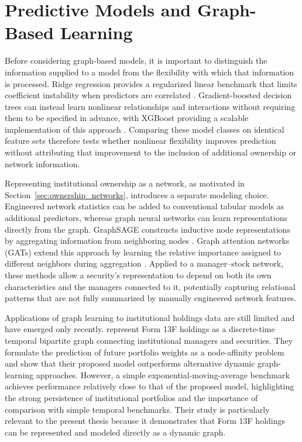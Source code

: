 \section{Predictive Models and Graph-Based Learning}
\label{sec:graph_learning_finance}

Before considering graph-based models, it is important to distinguish the information supplied to a model from the flexibility with which that information is processed. Ridge regression provides a regularized linear benchmark that limits coefficient instability when predictors are correlated \parencite{hoerl1970ridge}. Gradient-boosted decision trees can instead learn nonlinear relationships and interactions without requiring them to be specified in advance, with XGBoost providing a scalable implementation of this approach \parencite{chen2016xgboost}. Comparing these model classes on identical feature sets therefore tests whether nonlinear flexibility improves prediction without attributing that improvement to the inclusion of additional ownership or network information.

Representing institutional ownership as a network, as motivated in Section~\ref{sec:ownership_networks}, introduces a separate modeling choice. Engineered network statistics can be added to conventional tabular models as additional predictors, whereas graph neural networks can learn representations directly from the graph. GraphSAGE constructs inductive node representations by aggregating information from neighboring nodes \parencite{hamilton2017inductive}. Graph attention networks (GATs) extend this approach by learning the relative importance assigned to different neighbors during aggregation \parencite{velickovic2018graph}. Applied to a manager--stock network, these methods allow a security's representation to depend on both its own characteristics and the managers connected to it, potentially capturing relational patterns that are not fully summarized by manually engineered network features.

Applications of graph learning to institutional holdings data are still limited and have emerged only recently. \textcite{izadifar2026institutional} represent Form 13F holdings as a discrete-time temporal bipartite graph connecting institutional managers and securities. They formulate the prediction of future portfolio weights as a node-affinity problem and show that their proposed model outperforms alternative dynamic graph-learning approaches. However, a simple exponential-moving-average benchmark achieves performance relatively close to that of the proposed model, highlighting the strong persistence of institutional portfolios and the importance of comparison with simple temporal benchmarks. Their study is particularly relevant to the present thesis because it demonstrates that Form 13F holdings can be represented and modeled directly as a dynamic graph.

